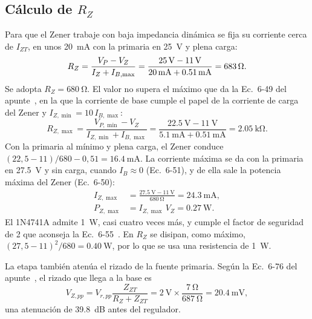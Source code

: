 \subsection{Cálculo de $R_Z$}
Para que el Zener trabaje con baja impedancia dinámica se fija su corriente cerca de $I_{ZT}$, en unos \SI{20}{\milli\ampere} con la primaria en \SI{25}{\volt} y plena carga:
\begin{equation}
    R_Z = \frac{V_{P} - V_Z}{I_Z + I_{B,\max}} = \frac{\SI{25}{\volt} - \SI{11}{\volt}}{\SI{20}{\milli\ampere} + \SI{0,51}{\milli\ampere}} = \SI{683}{\ohm}.
\end{equation}
Se adopta $R_Z = \SI{680}{\ohm}$. El valor no supera el máximo que da la Ec.~6-49 del apunte~\cite{ap2}, en la que la corriente de base cumple el papel de la corriente de carga del Zener y $I_{Z,\min} = 10\,I_{B,\max}$:
\begin{equation}
    R_{Z,\max} = \frac{V_{P,\min} - V_Z}{I_{Z,\min} + I_{B,\max}} = \frac{\SI{22,5}{\volt} - \SI{11}{\volt}}{\SI{5,1}{\milli\ampere} + \SI{0,51}{\milli\ampere}} = \SI{2,05}{\kilo\ohm}.
\end{equation}
Con la primaria al mínimo y plena carga, el Zener conduce $(22{,}5 - 11)/680 - 0{,}51 = \SI{16,4}{\milli\ampere}$. La corriente máxima se da con la primaria en \SI{27,5}{\volt} y sin carga, cuando $I_B \approx 0$ (Ec.~6-51), y de ella sale la potencia máxima del Zener (Ec.~6-50):
\begin{align}
    I_{Z,\max} &= \frac{\SI{27,5}{\volt} - \SI{11}{\volt}}{\SI{680}{\ohm}} = \SI{24,3}{\milli\ampere}, \\
    P_{Z,\max} &= I_{Z,\max}\, V_Z = \SI{0,27}{\watt}.
\end{align}
El 1N4741A admite \SI{1}{\watt}, casi cuatro veces más, y cumple el factor de seguridad de 2 que aconseja la Ec.~6-55~\cite{ap2}. En $R_Z$ se disipan, como máximo, $(27{,}5 - 11)^2/680 = \SI{0,40}{\watt}$, por lo que se usa una resistencia de \SI{1}{\watt}.

La etapa también atenúa el rizado de la fuente primaria. Según la Ec.~6-76 del apunte~\cite{ap2}, el rizado que llega a la base es
\begin{equation}
    V_{Z,pp} = V_{r,pp} \frac{Z_{ZT}}{R_Z + Z_{ZT}} = \SI{2}{\volt} \times \frac{\SI{7}{\ohm}}{\SI{687}{\ohm}} = \SI{20,4}{\milli\volt},
    \label{eq:rizado_zener}
\end{equation}
una atenuación de \SI{39,8}{\deci\bel} antes del regulador.

